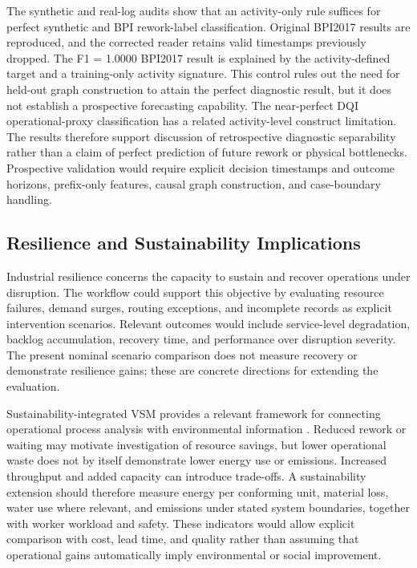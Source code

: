 \documentclass[pdflatex,iicol,Numbered,sn-basic]{sn-jnl}
\begin{document}
The synthetic and real-log audits show that an activity-only rule suffices for perfect synthetic and BPI rework-label classification. Original BPI2017 results are reproduced, and the corrected reader retains valid timestamps previously dropped. The F1 = 1.0000 BPI2017 result is explained by the activity-defined target and a training-only activity signature. This control rules out the need for held-out graph construction to attain the perfect diagnostic result, but it does not establish a prospective forecasting capability. The near-perfect DQI operational-proxy classification has a related activity-level construct limitation. The results therefore support discussion of retrospective diagnostic separability rather than a claim of perfect prediction of future rework or physical bottlenecks. Prospective validation would require explicit decision timestamps and outcome horizons, prefix-only features, causal graph construction, and case-boundary handling.

\subsection{Resilience and Sustainability Implications}
\label{subsec:resilience_sustainability}

Industrial resilience concerns the capacity to sustain and recover operations under disruption. The workflow could support this objective by evaluating resource failures, demand surges, routing exceptions, and incomplete records as explicit intervention scenarios. Relevant outcomes would include service-level degradation, backlog accumulation, recovery time, and performance over disruption severity. The present nominal scenario comparison does not measure recovery or demonstrate resilience gains; these are concrete directions for extending the evaluation.

Sustainability-integrated VSM provides a relevant framework for connecting operational process analysis with environmental information \cite{HorsthoferRauch2024SustainabilityVSM}. Reduced rework or waiting may motivate investigation of resource savings, but lower operational waste does not by itself demonstrate lower energy use or emissions. Increased throughput and added capacity can introduce trade-offs. A sustainability extension should therefore measure energy per conforming unit, material loss, water use where relevant, and emissions under stated system boundaries, together with worker workload and safety. These indicators would allow explicit comparison with cost, lead time, and quality rather than assuming that operational gains automatically imply environmental or social improvement.
\end{document}
